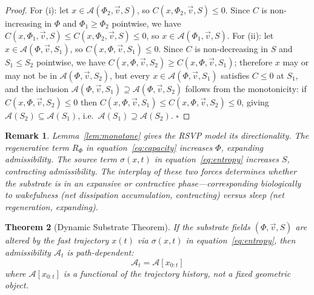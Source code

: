 \documentclass[12pt,a4paper]{article}
\newtheorem{theorem}{Theorem}[section]
\newtheorem{remark}[theorem]{Remark}
\begin{document}
\begin{proof}
For (i): let $x \in \mathcal{A}(\Phi_2, \vec{v}, S)$, so $C(x, \Phi_2, \vec{v}, S) \leq 0$. Since $C$ is non-increasing in $\Phi$ and $\Phi_1 \geq \Phi_2$ pointwise, we have $C(x, \Phi_1, \vec{v}, S) \leq C(x, \Phi_2, \vec{v}, S) \leq 0$, so $x \in \mathcal{A}(\Phi_1, \vec{v}, S)$. For (ii): let $x \in \mathcal{A}(\Phi, \vec{v}, S_1)$, so $C(x, \Phi, \vec{v}, S_1) \leq 0$. Since $C$ is non-decreasing in $S$ and $S_1 \leq S_2$ pointwise, we have $C(x, \Phi, \vec{v}, S_2) \geq C(x, \Phi, \vec{v}, S_1)$; therefore $x$ may or may not be in $\mathcal{A}(\Phi, \vec{v}, S_2)$, but every $x \in \mathcal{A}(\Phi, \vec{v}, S_1)$ satisfies $C \leq 0$ at $S_1$, and the inclusion $\mathcal{A}(\Phi,\vec{v},S_1) \supseteq \mathcal{A}(\Phi,\vec{v},S_2)$ follows from the monotonicity: if $C(x,\Phi,\vec{v},S_2)\leq 0$ then $C(x,\Phi,\vec{v},S_1)\leq C(x,\Phi,\vec{v},S_2)\leq 0$, giving $\mathcal{A}(S_2)\subseteq \mathcal{A}(S_1)$, i.e.\ $\mathcal{A}(S_1)\supseteq \mathcal{A}(S_2)$. $\square$
\end{proof}

\begin{remark}
Lemma~\ref{lem:monotone} gives the RSVP model its directionality. The regenerative term $R_\Phi$ in equation~\eqref{eq:capacity} increases $\Phi$, expanding admissibility. The source term $\sigma(x,t)$ in equation~\eqref{eq:entropy} increases $S$, contracting admissibility. The interplay of these two forces determines whether the substrate is in an expansive or contractive phase---corresponding biologically to wakefulness (net dissipation accumulation, contracting) versus sleep (net regeneration, expanding).
\end{remark}

\begin{theorem}[Dynamic Substrate Theorem]
\label{thm:dst}
If the substrate fields $(\Phi, \vec{v}, S)$ are altered by the fast trajectory $x(t)$ via $\sigma(x,t)$ in equation~\eqref{eq:entropy}, then admissibility $\mathcal{A}_t$ is path-dependent:
\[
\mathcal{A}_t = \mathcal{A}[x_{0:t}]
\]
where $\mathcal{A}[x_{0:t}]$ is a functional of the trajectory history, not a fixed geometric object.
\end{theorem}
\end{document}
